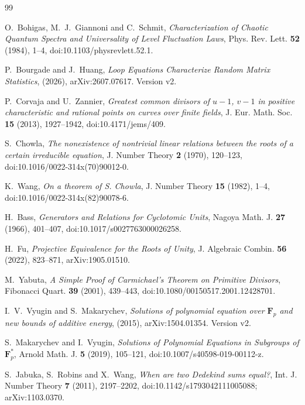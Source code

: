\begin{thebibliography}{99}
\small

O.~Bohigas, M.~J.~Giannoni and C.~Schmit,
\emph{Characterization of Chaotic Quantum Spectra and Universality of Level Fluctuation Laws},
Phys. Rev. Lett. \textbf{52} (1984), 1--4,
doi:10.1103/physrevlett.52.1.

P.~Bourgade and J.~Huang,
\emph{Loop Equations Characterize Random Matrix Statistics},
(2026),
arXiv:2607.07617.
Version v2.

P.~Corvaja and U.~Zannier,
\emph{Greatest common divisors of $u-1$, $v-1$ in positive characteristic and rational points on curves over finite fields},
J. Eur. Math. Soc. \textbf{15} (2013), 1927--1942,
doi:10.4171/jems/409.

S.~Chowla,
\emph{The nonexistence of nontrivial linear relations between the roots of a certain irreducible equation},
J. Number Theory \textbf{2} (1970), 120--123,
doi:10.1016/0022-314x(70)90012-0.

K.~Wang,
\emph{On a theorem of S. Chowla},
J. Number Theory \textbf{15} (1982), 1--4,
doi:10.1016/0022-314x(82)90078-6.

H.~Bass,
\emph{Generators and Relations for Cyclotomic Units},
Nagoya Math. J. \textbf{27} (1966), 401--407,
doi:10.1017/s0027763000026258.

H.~Fu,
\emph{Projective Equivalence for the Roots of Unity},
J. Algebraic Combin. \textbf{56} (2022), 823--871,
arXiv:1905.01510.

M.~Yabuta,
\emph{A Simple Proof of Carmichael's Theorem on Primitive Divisors},
Fibonacci Quart. \textbf{39} (2001), 439--443,
doi:10.1080/00150517.2001.12428701.

I.~V.~Vyugin and S.~Makarychev,
\emph{Solutions of polynomial equation over $\mathbf F_p$ and new bounds of additive energy},
(2015),
arXiv:1504.01354.
Version v2.

S.~Makarychev and I.~Vyugin,
\emph{Solutions of Polynomial Equations in Subgroups of $\mathbf F_p^*$},
Arnold Math. J. \textbf{5} (2019), 105--121,
doi:10.1007/s40598-019-00112-z.

S.~Jabuka, S.~Robins and X.~Wang,
\emph{When are two Dedekind sums equal?},
Int. J. Number Theory \textbf{7} (2011), 2197--2202,
doi:10.1142/s1793042111005088; arXiv:1103.0370.


\end{thebibliography}
